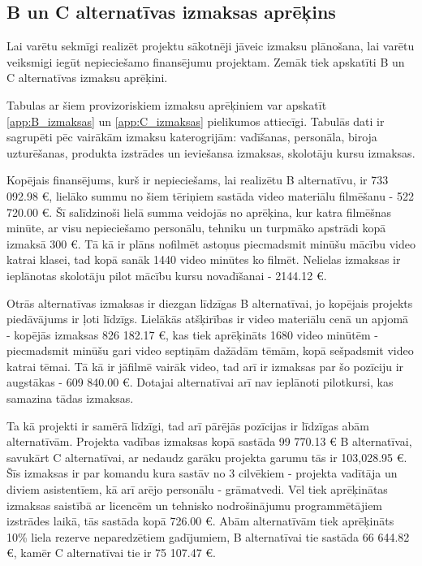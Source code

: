 \subsection{B un C alternatīvas izmaksas aprēķins}
Lai varētu sekmīgi realizēt projektu sākotnēji jāveic izmaksu plānošana, lai
varētu veiksmigi iegūt nepieciešamo finansējumu projektam. Zemāk tiek apskatīti
B un C alternatīvas izmaksu aprēķini.
\par
Tabulas ar šiem provizoriskiem izmaksu aprēķiniem var apskatīt \ref{app:B_izmaksas} un \ref{app:C_izmaksas}
pielikumos attiecīgi. Tabulās dati ir sagrupēti pēc vairākām izmaksu katerogrijām: vadīšanas,
personāla, biroja uzturēšanas, produkta izstrādes un ieviešansa izmaksas, skolotāju kursu izmaksas. 
\par
Kopējais finansējums, kurš ir nepieciešams, lai realizētu B alternatīvu, ir 733 092.98 €, lielāko
summu no šiem tēriņiem sastāda video materiālu filmēšanu - 522 720.00 €. Šī salīdzinoši lielā summa
veidojās no aprēķina, kur katra filmēšnas minūte, ar visu nepieciešamo personālu, tehniku un turpmāko
apstrādi kopā izmaksā 300 €. Tā kā ir plāns nofilmēt astoņus piecmadsmit minūšu mācību video katrai
klasei, tad kopā sanāk 1440 video minūtes ko filmēt. Nelielas izmaksas ir ieplānotas skolotāju pilot 
mācību kursu novadīšanai - 2144.12 €. 
\par
Otrās alternatīvas izmaksas ir diezgan līdzīgas B alternatīvai, jo kopējais projekts piedāvājums ir ļoti
līdzīgs. Lielākās atšķirības ir video materiālu cenā un apjomā - kopējās izmaksas 826 182.17 €, kas tiek
aprēķināts 1680 video minūtēm - piecmadsmit minūšu gari video septiņām dažādām tēmām, kopā sešpadsmit
video katrai tēmai. Tā kā ir jāfilmē vairāk video, tad arī ir izmaksas par šo pozīciju ir augstākas - 
609 840.00 €. Dotajai alternatīvai arī nav ieplānoti pilotkursi, kas samazina tādas izmaksas.
\par
Ta kā projekti ir samērā līdzīgi, tad arī pārējās pozīcijas ir līdzīgas abām alternatīvām.
Projekta vadības izmaksas kopā sastāda 99 770.13 € B alternatīvai, savukārt C alternatīvai, 
ar nedaudz garāku projekta garumu tās ir 103,028.95 €. Šīs izmaksas ir par komandu kura sastāv 
no 3 cilvēkiem - projekta vadītāja un diviem asistentīem, kā arī arējo personālu - grāmatvedi. Vēl 
tiek aprēķinātas izmaksas saistībā ar licencēm un tehnisko nodrošinājumu programmētājiem izstrādes laikā,
tās sastāda kopā 726.00 €. Abām alternatīvām tiek aprēķināts 10\% liela rezerve neparedzētiem gadījumiem,
B alternatīvai tie sastāda 66 644.82 €, kamēr C alternatīvai tie ir 75 107.47 €. 
